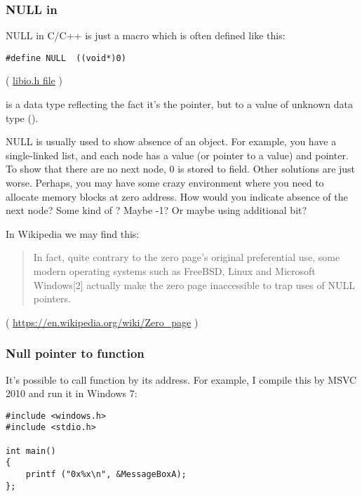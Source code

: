 \subsubsection{NULL in \CCpp}

NULL in C/C++ is just a macro which is often defined like this:

\begin{lstlisting}[style=customc]
#define NULL  ((void*)0)
\end{lstlisting}
( \href{https://github.com/wzhy90/linaro_toolchains/blob/8ff8ae680bac04558d10cc9626e12c4c2f6c1348/arm-cortex_a15-linux-gnueabihf/libc/usr/include/libio.h#L70}{libio.h file} )

 is a data type reflecting the fact it's the pointer, but to a value of unknown data type ().

NULL is usually used to show absence of an object.
For example, you have a single-linked list, and each node has a value (or pointer to a value) and  pointer.
To show that there are no next node, 0 is stored to  field.
Other solutions are just worse.
Perhaps, you may have some crazy environment where you need to allocate memory blocks at zero address. How would you indicate absence of the next node?
Some kind of ? Maybe -1? Or maybe using additional bit?

In Wikipedia we may find this:

\begin{framed}
\begin{quotation}
In fact, quite contrary to the zero page's original preferential use, some modern operating systems such as FreeBSD, Linux and Microsoft Windows[2] actually make the zero page inaccessible to trap uses of NULL pointers. 
\end{quotation}
\end{framed}
( \url{https://en.wikipedia.org/wiki/Zero_page} )

\subsubsection{Null pointer to function}

It's possible to call function by its address.
For example, I compile this by MSVC 2010 and run it in Windows 7:

\begin{lstlisting}[style=customc]
#include <windows.h>
#include <stdio.h>

int main()
{
	printf ("0x%x\n", &MessageBoxA);
};
\end{lstlisting}

